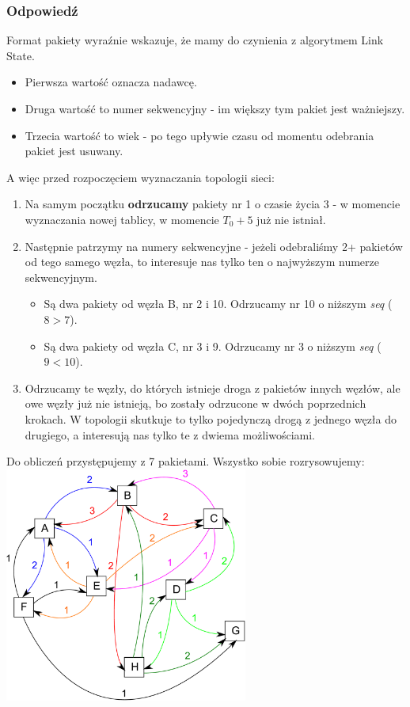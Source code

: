 		\subsubsection{Odpowiedź}
			Format pakiety wyraźnie wskazuje, że mamy do czynienia z algorytmem Link State.
			\begin{itemize}
				\item Pierwsza wartość oznacza nadawcę.
				\item Druga wartość to numer sekwencyjny - im większy tym pakiet jest ważniejszy.
				\item Trzecia wartość to wiek - po tego upływie czasu od momentu odebrania pakiet jest usuwany.
			\end{itemize}
			A więc przed rozpoczęciem wyznaczania topologii sieci:
			\begin{enumerate}
				\item Na samym początku \textbf{odrzucamy} pakiety nr 1 o czasie życia 3 - w momencie wyznaczania nowej tablicy, w momencie $ T_0+5 $ już nie istniał.
				\item Następnie patrzymy na numery sekwencyjne - jeżeli odebraliśmy 2+ pakietów od tego samego węzła, to interesuje nas tylko ten o najwyższym numerze sekwencyjnym.
				\begin{itemize}
					\item Są dwa pakiety od węzła B, nr 2 i 10. Odrzucamy nr 10 o niższym \textit{seq} ($ 8 > 7 $).
					\item Są dwa pakiety od węzła C, nr 3 i 9. Odrzucamy nr 3 o niższym \textit{seq} ($ 9 < 10 $).
				\end{itemize}
				\item Odrzucamy te węzły, do których istnieje droga z pakietów innych węzłów, ale owe węzły już nie istnieją, bo zostały odrzucone w dwóch poprzednich krokach. W topologii skutkuje to tylko pojedynczą drogą z jednego węzła do drugiego, a interesują nas tylko te z dwiema możliwościami.
			\end{enumerate}
			Do obliczeń przystępujemy z 7 pakietami. Wszystko sobie rozrysowujemy:\\
				\includegraphics[width=8.0cm]{./images/zadanie05.pdf}
